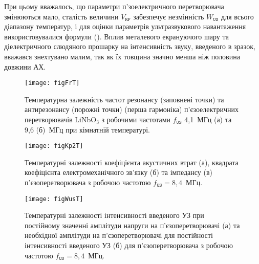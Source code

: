 \documentclass[a4paper,14pt,oneside,openany]{memoir}
\begin{document}
При цьому вважалось, що параметри п'зоелектричного перетворювача змінюються мало, сталість величини $V_\mathtt{RF}$ забезпечує незмінність $W_\mathtt{US}$  для всього діапазону температур, і для оцінки параметрів ультразвукового навантаження використовувалися формули
().
Вплив металевого екрануючого шару та діелектричного слюдяного прошарку на інтенсивність звуку, введеного в зразок, вважався знехтувано малим, так як їх товщина значно менша ніж половина довжини АХ.


\begin{figure}
\center
\texttt{[image: figFrT]}%
\caption{\label{figFrT}
Температурна залежність частот резонансу (заповнені точки) та антирезонансу (порожні точки) (перша гармоніка)
п'єзоелектричних перетворювачів LiNbO$_3$ з робочими частотами $f_\mathtt{US}$ 4,1~МГц (а) та 9,6 (б)~МГц при кімнатній температурі.
}
\end{figure}

%
\cite{LNO_C:Temp,Si_C:Temp}


\begin{figure}
\center
\texttt{[image: figKp2T]}%
\caption{\label{figKp2T}
Температурні залежності коефіцієнта акустичних втрат (а),
квадрата коефіцієнта електромеханічного зв'язку (б) та
імпедансу (в) п'єзоперетворювача з робочою частотою $f_\mathtt{US}=8,4$~МГц.
}
\end{figure}


\begin{figure}
\center
\texttt{[image: figWusT]}%
\caption{\label{figWusT}
Температурні залежності
інтенсивності введеного УЗ при постійному значенні амплітуди напруги на п'єзоперетворювачі (а)
та необхідної амплітуди на п'єзоперетворювачі для постійності інтенсивності введеного УЗ (б)
для п'єзоперетворювача з робочою частотою $f_\mathtt{US}=8,4$~МГц.
}
\end{figure}
\end{document}
